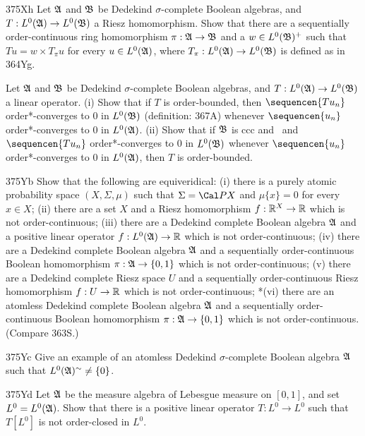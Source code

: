 {\spheader 375Xh Let $\frak A$ and $\frak B$ be Dedekind $\sigma$-complete
Boolean algebras, and $T:L^0(\frak A)\to L^0(\frak B)$ a Riesz
homomorphism.   Show that there are a
sequentially order-continuous ring homomorphism $\pi:\frak A\to\frak B$ and
a $w\in L^0(\frak B)^+$ such that $Tu=w\times T_{\pi}u$ for every
$u\in L^0(\frak A)$, where $T_{\pi}:L^0(\frak A)\to L^0(\frak B)$ is
defined as in 364Yg.

Let $\frak A$ and $\frak B$ be Dedekind $\sigma$-complete
Boolean algebras, and $T:L^0(\frak A)\to L^0(\frak B)$
a linear operator.   (i) Show that if $T$ is order-bounded, then
$\sequencen{Tu_n}$ order*-converges to $0$ in
$L^0(\frak B)$ (definition: 367A)
whenever $\sequencen{u_n}$ order*-converges to $0$ in $L^0(\frak A)$.
(ii) Show that if $\frak B$ is ccc and \wsid\ and
$\sequencen{Tu_n}$ order*-converges to $0$ in $L^0(\frak B)$
whenever $\sequencen{u_n}$ order*-converges to $0$ in $L^0(\frak A)$, then
$T$ is order-bounded.

\spheader 375Yb
Show that the following are equiveridical:  (i) there is a purely atomic
probability space $(X,\Sigma,\mu)$
such that $\Sigma=\Cal PX$ and $\mu\{x\}=0$ for every $x\in X$;  (ii)
there are a set $X$ and a Riesz homomorphism $f:\Bbb R^X\to\Bbb R$ which
is not order-continuous;   (iii) there are a Dedekind complete Boolean
algebra $\frak A$ and a positive linear operator
$f:L^0(\frak A)\to\Bbb R$ which is not order-continuous;  (iv) there are
a Dedekind complete Boolean algebra $\frak A$ and a sequentially
order-continuous Boolean homomorphism $\pi:\frak A\to\{0,1\}$ which is
not order-continuous;  (v) there are a Dedekind complete Riesz space $U$
and a sequentially order-continuous Riesz homomorphism $f:U\to\Bbb R$
which is not order-continuous;
*(vi) there are an atomless Dedekind complete Boolean algebra $\frak A$
and a sequentially
order-continuous Boolean homomorphism $\pi:\frak A\to\{0,1\}$ which is
not order-continuous.   (Compare 363S.)

\spheader 375Yc Give an example of an atomless Dedekind
$\sigma$-complete Boolean algebra $\frak A$ such that
$L^0(\frak A)^{\sim}\ne\{0\}$.

\spheader 375Yd
Let $\frak A$ be the measure algebra of Lebesgue measure on $[0,1]$, and
set $L^0=L^0(\frak A)$.   Show that there is a positive linear operator
$T:L^0\to L^0$ such that $T[L^0]$ is not order-closed in $L^0$.

}
